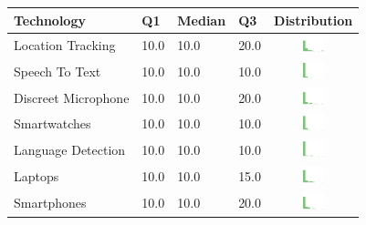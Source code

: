 \begin{table}[h]
\begin{center}
\small
\begin{tabular}{| p{2.6cm} | p{.8cm} | p{.8cm} | p{.8cm} | c |}
\hline
Technology & Q1 &  Median & Q3 & Distribution  \\ 
\hline
Location Tracking & 10.0 & 10.0 & 20.0 & \includegraphics[width = 2cm, height = 0.5cm]{tex-inputs/table-images/locationtrackingrisk} \\ 
Speech To Text & 10.0 & 10.0 & 10.0 & \includegraphics[width = 2cm, height = 0.5cm]{tex-inputs/table-images/speechtotextrisk} \\ 
Discreet Microphone & 10.0 & 10.0 & 20.0 & \includegraphics[width = 2cm, height = 0.5cm]{tex-inputs/table-images/discreetmicrophonerisk} \\ 
Smartwatches & 10.0 & 10.0 & 10.0 & \includegraphics[width = 2cm, height = 0.5cm]{tex-inputs/table-images/smartwatchesrisk} \\ 
Language Detection & 10.0 & 10.0 & 10.0 & \includegraphics[width = 2cm, height = 0.5cm]{tex-inputs/table-images/languagedetectionrisk} \\ 
Laptops & 10.0 & 10.0 & 15.0 & \includegraphics[width = 2cm, height = 0.5cm]{tex-inputs/table-images/laptopsrisk} \\ 
Smartphones & 10.0 & 10.0 & 20.0 & \includegraphics[width = 2cm, height = 0.5cm]{tex-inputs/table-images/smartphonesrisk} \\ 

\end{tabular}
\end{center}
\end{table}
